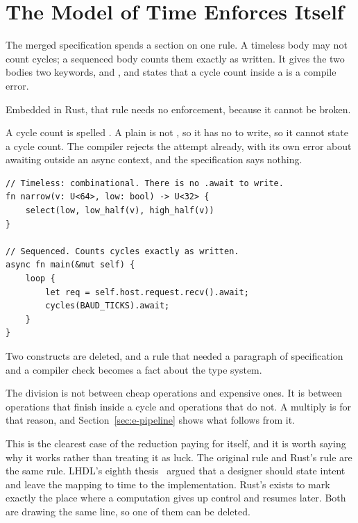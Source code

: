 \section{The Model of Time Enforces Itself}
\label{sec:e-time}

The merged specification spends a section on one rule. A timeless body may
not count cycles; a sequenced body counts them exactly as written. It gives
the two bodies two keywords,  and , and states that a
cycle count inside a  is a compile error.

Embedded in Rust, that rule needs no enforcement, because it cannot be
broken.

A cycle count is spelled . A plain  is not
, so it has no  to write, so it cannot state a
cycle count. The compiler rejects the attempt already, with its own error
about awaiting outside an async context, and the specification says
nothing.

\begin{lstlisting}[caption={The model of time, enforced by the type system. The first function has no \code{.await} to write, so it cannot state a cycle count.},label={lst:time}]
// Timeless: combinational. There is no .await to write.
fn narrow(v: U<64>, low: bool) -> U<32> {
    select(low, low_half(v), high_half(v))
}

// Sequenced. Counts cycles exactly as written.
async fn main(&mut self) {
    loop {
        let req = self.host.request.recv().await;
        cycles(BAUD_TICKS).await;
    }
}
\end{lstlisting}

Two constructs are deleted, and a rule that needed a paragraph of
specification and a compiler check becomes a fact about the type system.

The division is not between cheap operations and expensive ones. It is
between operations that finish inside a cycle and operations that do not.
A multiply is  for that reason, and
Section~\ref{sec:e-pipeline} shows what follows from it.

This is the clearest case of the reduction paying for itself, and it is
worth saying why it works rather than treating it as luck. The original
rule and Rust's rule are the same rule. LHDL's eighth thesis~\cite{theses}
argued that a designer should state intent and leave the mapping to time to
the implementation. Rust's  exists to mark exactly the place
where a computation gives up control and resumes later. Both are drawing
the same line, so one of them can be deleted.
